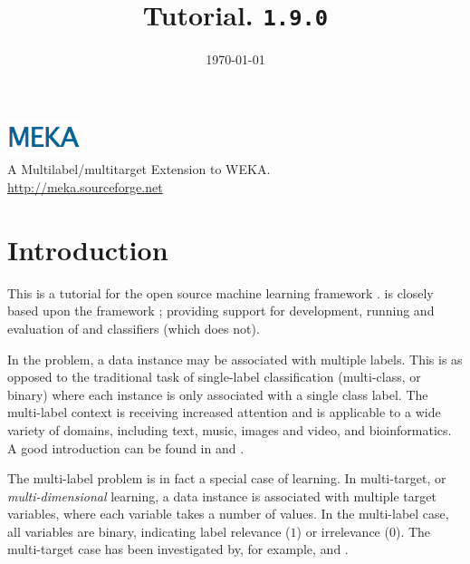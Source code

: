 \documentclass[11pt]{article}
\newcommand{\MEKA}{Meka}
\newcommand{\WEKA}{Weka}
\def\version{{\tt 1.9.0}}
\begin{document}
\title{Tutorial. \framework{\MEKA} \version }


\date{\mydate\today}

\maketitle

\begin{center}
	\includegraphics{MEKA.png}\\
		A Multilabel/multitarget Extension to WEKA.\\
		\url{http://meka.sourceforge.net}
\end{center}

\tableofcontents

\thispagestyle{empty}
\pagebreak

\section{Introduction}

This is a tutorial for the open source machine learning framework \framework{\MEKA}. \framework{\MEKA} is closely based upon the \framework{\WEKA} framework \cite{WEKA}; providing support for development, running and evaluation of  and  classifiers (which  does not).

In the  problem, a data instance may be associated with multiple labels. This is as opposed to the traditional task of single-label classification (\ie multi-class, or binary) where each instance is only associated with a single class label. The multi-label context is receiving increased attention and is applicable to a wide variety of domains, including text, music, images and video, and bioinformatics. A good introduction can be found in \cite{MMD} and \cite{Thesis}.

The multi-label problem is in fact a special case of  learning. In multi-target, or \textit{multi-dimensional} learning, a data instance is associated with multiple target variables, where each variable takes a number of values. In the multi-label case, all variables are binary, indicating label relevance ($1$) or irrelevance ($0$). The multi-target case has been investigated by, for example, \cite{UPM} and \cite{MT}.  
\end{document}
